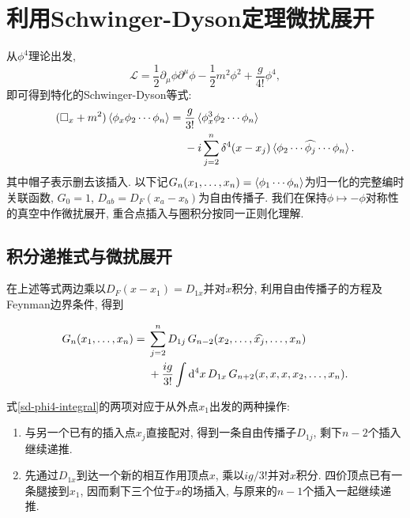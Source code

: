 \section{利用Schwinger-Dyson定理微扰展开}\label{schwinger-dyson-perturbative-expansion}

从$\phi^4$理论出发,
\begin{equation*}
    \mathcal L=\frac12\partial_\mu\phi\partial^\mu\phi-\frac12m^2\phi^2+\frac g{4!}\phi^4,
\end{equation*}
即可得到特化的Schwinger-Dyson等式:
\begin{align*}
    (\Box_x+m^2)\braket{\phi_x\phi_2\cdots\phi_n}
    ={}&\frac g{3!}\braket{\phi_x^3\phi_2\cdots\phi_n}\\
    &-i\sum_{j=2}^n\delta^4(x-x_j)
    \braket{\phi_2\cdots\widehat{\phi_j}\cdots\phi_n}.
\end{align*}
其中帽子表示删去该插入. 以下记$G_n(x_1,\ldots,x_n)=\braket{\phi_1\cdots\phi_n}$为归一化的完整编时关联函数, $G_0=1$, $D_{ab}=D_F(x_a-x_b)$为自由传播子. 我们在保持$\phi\mapsto-\phi$对称性的真空中作微扰展开, 重合点插入与圈积分按同一正则化理解.

\subsection{积分递推式与微扰展开}

在上述等式两边乘以$D_F(x-x_1)=D_{1x}$并对$x$积分, 利用自由传播子的方程及Feynman边界条件, 得到
\begin{important}
    \begin{align}
        G_n(x_1,\ldots,x_n)
        ={}&\sum_{j=2}^n D_{1j}\,
        G_{n-2}(x_2,\ldots,\widehat{x_j},\ldots,x_n)\notag\\
        &+\frac{ig}{3!}\int\mathrm d^4x\,D_{1x}\,
        G_{n+2}(x,x,x,x_2,\ldots,x_n).
        \label{sd-phi4-integral}
    \end{align}
\end{important}

式\eqref{sd-phi4-integral}的两项对应于从外点$x_1$出发的两种操作:
\begin{enumerate}
    \item 与另一个已有的插入点$x_j$直接配对, 得到一条自由传播子$D_{1j}$, 剩下$n-2$个插入继续递推.
    \item 先通过$D_{1x}$到达一个新的相互作用顶点$x$, 乘以$ig/3!$并对$x$积分. 四价顶点已有一条腿接到$x_1$, 因而剩下三个位于$x$的场插入, 与原来的$n-1$个插入一起继续递推.
\end{enumerate}

